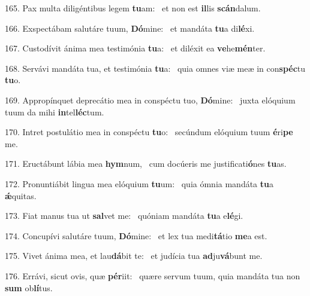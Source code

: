 165. Pax multa diligéntibus legem \textbf{tu}am: \ast\  et non est \textbf{il}lis \textbf{scán}dalum.\

166. Exspectábam salutáre tuum, \textbf{Dó}mine: \ast\  et mandáta \textbf{tu}a di\textbf{lé}xi.\

167. Custodívit ánima mea testimónia \textbf{tu}a: \ast\  et diléxit ea \textbf{ve}he\textbf{mén}ter.\

168. Servávi mandáta tua, et testimónia \textbf{tu}a: \ast\  quia omnes viæ meæ in con\textbf{spéc}tu \textbf{tu}o.\

169. Appropínquet deprecátio mea in conspéctu tuo, \textbf{Dó}mine: \ast\  juxta elóquium tuum da mihi \textbf{in}tel\textbf{léc}tum.\

170. Intret postulátio mea in conspéctu \textbf{tu}o: \ast\  secúndum elóquium tuum \textbf{é}ri\textbf{pe} me.\

171. Eructábunt lábia mea \textbf{hym}num, \ast\  cum docúeris me justificati\textbf{ó}nes \textbf{tu}as.\

172. Pronuntiábit lingua mea elóquium \textbf{tu}um: \ast\  quia ómnia mandáta \textbf{tu}a \textbf{ǽ}quitas.\

173. Fiat manus tua ut \textbf{sal}vet me: \ast\  quóniam mandáta \textbf{tu}a e\textbf{lé}gi.\

174. Concupívi salutáre tuum, \textbf{Dó}mine: \ast\  et lex tua medi\textbf{tá}tio \textbf{me}a est.\

175. Vivet ánima mea, et lau\textbf{dá}bit te: \ast\  et judícia tua \textbf{ad}ju\textbf{vá}bunt me.\

176. Errávi, sicut ovis, quæ \textbf{pér}iit: \ast\  quære servum tuum, quia mandáta tua non \textbf{sum} ob\textbf{lí}tus.\

